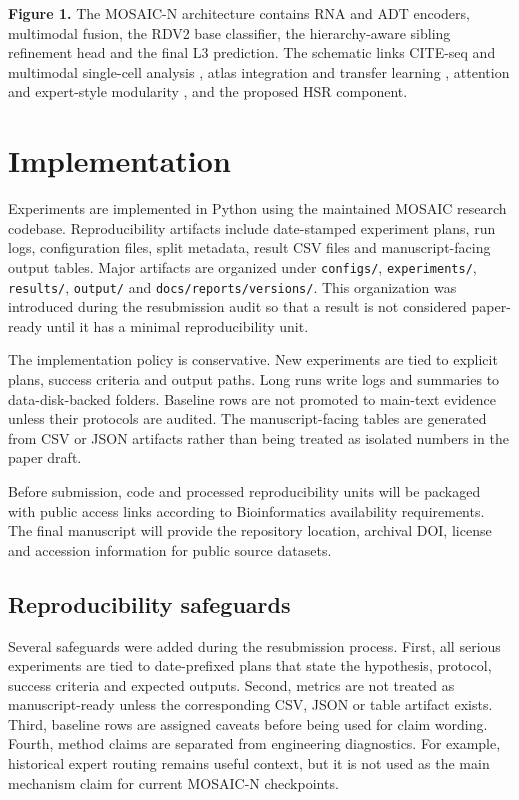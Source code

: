 \documentclass[unnumsec,webpdf,contemporary,large,numbered]{oup-authoring-template}
\begin{document}
\noindent\textbf{Figure 1.}
The MOSAIC-N architecture contains RNA and ADT encoders, multimodal fusion, the RDV2 base classifier, the hierarchy-aware sibling refinement head and the final L3 prediction. The schematic links CITE-seq and multimodal single-cell analysis \citep{stoeckius2017cite,hao2021}, atlas integration and transfer learning \citep{luecken2022,lotfollahi2022}, attention and expert-style modularity \citep{vaswani2017,shazeer2017moe}, and the proposed HSR component.

\section{Implementation}

Experiments are implemented in Python using the maintained MOSAIC research codebase. Reproducibility artifacts include date-stamped experiment plans, run logs, configuration files, split metadata, result CSV files and manuscript-facing output tables. Major artifacts are organized under \texttt{configs/}, \texttt{experiments/}, \texttt{results/}, \texttt{output/} and \texttt{docs/reports/versions/}. This organization was introduced during the resubmission audit so that a result is not considered paper-ready until it has a minimal reproducibility unit.

The implementation policy is conservative. New experiments are tied to explicit plans, success criteria and output paths. Long runs write logs and summaries to data-disk-backed folders. Baseline rows are not promoted to main-text evidence unless their protocols are audited. The manuscript-facing tables are generated from CSV or JSON artifacts rather than being treated as isolated numbers in the paper draft.

Before submission, code and processed reproducibility units will be packaged with public access links according to Bioinformatics availability requirements. The final manuscript will provide the repository location, archival DOI, license and accession information for public source datasets.

\subsection{Reproducibility safeguards}

Several safeguards were added during the resubmission process. First, all serious experiments are tied to date-prefixed plans that state the hypothesis, protocol, success criteria and expected outputs. Second, metrics are not treated as manuscript-ready unless the corresponding CSV, JSON or table artifact exists. Third, baseline rows are assigned caveats before being used for claim wording. Fourth, method claims are separated from engineering diagnostics. For example, historical expert routing remains useful context, but it is not used as the main mechanism claim for current MOSAIC-N checkpoints.
\end{document}
